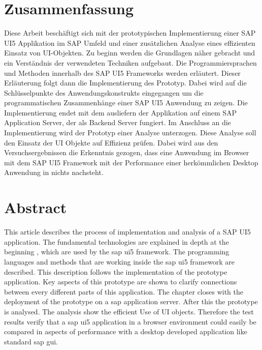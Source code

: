 \section*{Zusammenfassung}
Diese Arbeit beschäftigt sich mit der prototypischen Implementierung einer SAP UI5 Applikation im SAP Umfeld und einer zusätzlichen Analyse eines effizienten Einsatz von UI-Objekten. Zu beginn werden die Grundlagen näher gebracht und ein Verständnis der verwendeten Techniken aufgebaut. Die Programmiersprachen und Methoden innerhalb des SAP UI5 Frameworks werden erläutert. Dieser Erläuterung folgt dann die Implementierung des Prototyp. Dabei wird auf die Schlüsselpunkte des Anwendungskonstrukts eingegangen um die programmatischen Zusammenhänge einer SAP UI5 Anwendung zu zeigen. Die Implementierung endet mit dem ausliefern der Applikation auf einem SAP Application Server, der als Backend Server fungiert. Im Anschluss an die Implementierung wird der Prototyp einer Analyse unterzogen. Diese Analyse soll den Einsatz der UI Objekte auf Effizienz prüfen. Dabei wird aus den Versuchsergebnissen die Erkenntnis gezogen, dass eine Anwendung im Browser mit dem SAP UI5 Framework mit der Performance einer herkömmlichen Desktop Anwendung in nichts nachsteht.


%


\section*{Abstract}
This article describes the process of implementation and analysis of a SAP UI5 application. The fundamental technologies are explained in depth at the beginning , which are used by the sap ui5 framework. The programming languages and methods that are working inside the sap ui5 framework are described. This description follows the implementation of the prototype application. Key aspects of this prototype are shown to clarify connections between every different parts of this application. The chapter closes with the deployment of the prototype on a sap application server. After this the prototype is analysed. The analysis show the efficient Use of UI objects. Therefore the test results verify that a sap ui5 application in a browser environment could easily be compared in aspects of performance with a desktop developed application like standard sap gui.